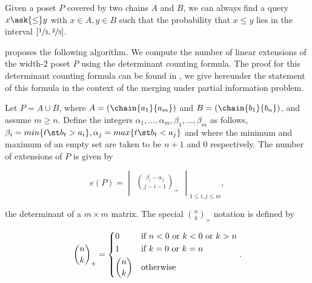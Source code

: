\begin{theorem}
Given a poset \(P\) covered by two chains \(A\) and \(B\), we can always find
a query \(x \ask{\le} y\) with \(x \in A, y \in B\) such that the probability
that \(x \le y\) lies in the interval \([\sfrac{1}{3}, \sfrac{2}{3}]\).
\end{theorem}

\citet*{linial:1984} proposes the following algorithm. We compute the number of
linear extensions of the width-\(2\) poset \(P\) using the determinant
counting formula. The proof for this determinant counting formula can be found in
\citet*{mohanty:1979}, we give hereunder the statement of this formula in the
context of the merging under partial information problem.

\begin{theorem}
Let \(P = A \cup B\), where \(A = (\chain{a_1}{a_m})\) and \(B =
(\chain{b_1}{b_n})\), and assume \(m \ge n\). Define the integers
\(\alpha_1,\ldots,\alpha_m,\beta_1,\ldots,\beta_m\) as follows, \(\beta_i =
min\{t \st b_t > a_i\}, \alpha_j = max\{t \st b_t < a_j\}\) and where the
minimum and maximum of an empty set are taken to be \(n + 1\) and \(0\)
respectively. The number of extensions of \(P\) is given by

\begin{displaymath}
e(P) =
\begin{vmatrix}
\binom{\beta_i - \alpha_j}{j - i - 1}_{+}
\end{vmatrix}_{1 \le i , j \le m},
\end{displaymath}

the determinant of a \(m \times m\) matrix. The special \(\binom{n}{k}_{+}\)
notation is defined by

\begin{displaymath}
\binom{n}{k}_{+} =
\begin{dcases*}
0            & if  \(n < 0\)  or \(k < 0\)  or \(k > n\)\\
1            & if \(k = 0\)  or \(k = n\)\\
\binom{n}{k} & otherwise\\
\end{dcases*}.
\end{displaymath}
\end{theorem}


